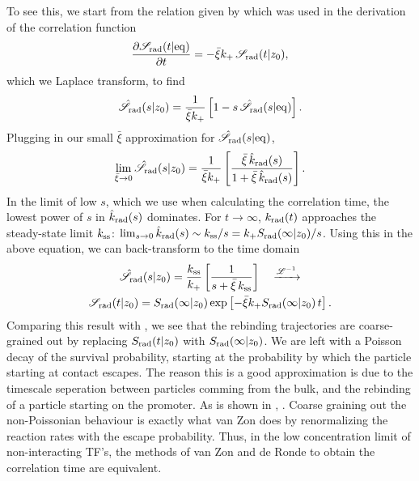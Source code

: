 To see this, we start from the relation given by  which was used in the derivation of the correlation function 
\begin{equation}
 \frac{\partial \mathscr{S}_{\rm rad}(t|{\rm eq})}{\partial t} = -\bar{\xi} k_+ \, \mathscr{S}_{\rm rad}(t|z_0),
\end{equation}
which we Laplace transform, to find
\begin{equation}
 \hat{\mathscr{S}}_{\rm rad}(s|z_0) = \frac{1}{\bar{\xi}k_+} \left[ 1 - s\,\hat{\mathscr{S}}_{\rm rad}(s|{\rm eq})\right].
\end{equation}
Plugging in our small $\bar{\xi}$ approximation for $\hat{\mathscr{S}}_{\rm rad}(s|{\rm eq})$, 
\begin{equation}
 \lim_{\bar{\xi}\to 0} \hat{\mathscr{S}}_{\rm rad}(s|z_0) = \frac{1}{\bar{\xi} k_+} \left[ \frac{\bar{\xi}\,\hat{k}_{\rm rad}(s)}{1 + \bar{\xi}\,\hat{k}_{\rm rad}(s)}\right].
\end{equation}
In the limit of low $s$, which we use when calculating the correlation time, the lowest power of $s$ in $\hat{k}_{\rm rad}(s)$ dominates. For $t\to\infty$, $k_{\rm rad}(t)$ approaches the steady-state limit $k_{\rm ss}$: $\lim_{s\to0} \hat{k}_{\rm rad}(s) \sim k_{\rm ss}/s = k_+ S_{\rm rad}(\infty|z_0)/s$. Using this in the above equation, we can back-transform to the time domain
\begin{multline}
 \hat{\mathscr{S}}_{\rm rad}(s|z_0) = \frac{k_{\rm ss}}{k_+} \left[ \frac{1}{s + \bar{\xi}\,k_{\rm ss}} \right] \quad \xrightarrow{\mathscr{L}^{-1}} \\ \mathscr{S}_{\rm rad}(t|z_0) = S_{\rm rad}(\infty|z_0)\,{\rm exp}\left[ -\bar{\xi} k_+ S_{\rm rad}(\infty|z_0)\,t \right].
\end{multline}
Comparing this result with , we see that the rebinding trajectories are coarse-grained out by replacing $S_{\rm rad}(t|z_0)$ with $S_{\rm rad}(\infty|z_0)$. We are left with a Poisson decay of the survival probability, starting at the probability by which the particle starting at contact escapes. The reason this is a good approximation is due to the timescale seperation between particles comming from the bulk, and the rebinding of a particle starting on the promoter. As is shown in , . Coarse graining out the non-Poissonian behaviour is exactly what van Zon does by renormalizing the reaction rates with the escape probability. Thus, in the low concentration limit of non-interacting TF's, the methods of van Zon and de Ronde to obtain the correlation time are equivalent.


